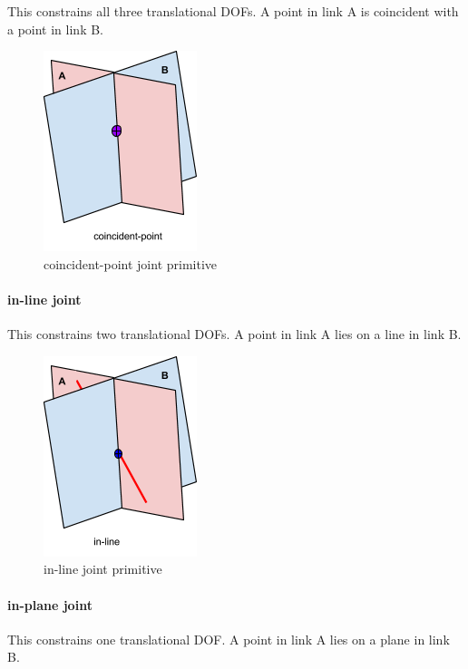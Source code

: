 \documentclass[]{report}
\begin{document}
This constrains all three translational DOFs. 
A point in link A is coincident with a point in link B. 

\begin{figure}[ht!]
	\centering
	\includegraphics[scale=0.7]{images/image06.png}
	\caption{coincident-point joint primitive}
	\label{fig:coincident-point-primitive}
\end{figure}

\paragraph{in-line joint}

This constrains two translational DOFs. 
A point in link A lies on a line in link B. 

\begin{figure}[ht!]
	\centering
	\includegraphics[scale=0.7]{images/image14.png}
	\caption{in-line joint primitive}
    \label{fig:in-line-primitive}
\end{figure}

\paragraph{in-plane joint}

This constrains one translational DOF. 
A point in link A lies on a plane in link B.
\end{document}
